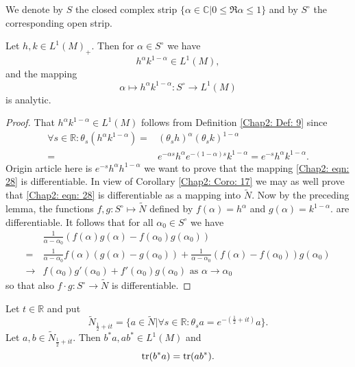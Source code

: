 We denote by $S$ the closed complex strip $\{\alpha\in \mathbb{C}|0\leq \Re \alpha\leq 1\}$ and by $S^\circ$ the corresponding open strip. \par
\begin{lemma}\label{Chap2: Lemma: 19}
    Let $h,k\in L^1(M)_+$. Then for $\alpha\in S^\circ$ we have 
\[
    h^\alpha k^{1-\alpha}\in L^1(M),
\]
and the mapping 
\begin{equation}\label{Chap2: eqn: 28}
    \alpha\mapsto h^\alpha k^{1-\alpha}: S^\circ \to L^1(M)
\end{equation} 
is analytic.
\end{lemma}
\begin{proof}
    That $ h^\alpha k^{1-\alpha}\in L^1(M)$ follows from Definition \ref{Chap2: Def: 9} since 
    \[
        \begin{split}
            \forall s\in \mathbb{R}: \theta_s(h^\alpha k^{1-\alpha})=&(\theta_s h)^\alpha (\theta_s k)^{1-\alpha}\\
            =& e^{-\alpha s}h^\alpha e^{-(1-\alpha)s}k^{1-\alpha}=e^{-s}h^\alpha k^{1-\alpha}.
        \end{split}
    \]
    {\color{red} Origin article here is $e^{-s}h^\alpha h^{1-\alpha}$} we want to prove that the mapping \eqref{Chap2: eqn: 28} is differentiable. In view of Corollary \ref{Chap2: Coro: 17} we may as well prove that \eqref{Chap2: eqn: 28} is differentiable as a mapping into $\tilde{N}$. Now by the preceding lemma, the functions $f,g:S^\circ \mapsto \tilde{N}$ defined by $f(\alpha)=h^\alpha$ and $g(\alpha)=k^{1-\alpha}.$ are differentiable. It follows that for all $\alpha_0\in S^\circ$ we have 
    \[
        \begin{split}
            &\frac{1}{\alpha-\alpha_0}(f(\alpha)g(\alpha)-f(\alpha_0)g(\alpha_0))\\
            =&\frac{1}{\alpha-\alpha_0}f(\alpha)(g(\alpha)-g(\alpha_0))+\frac{1}{\alpha-\alpha_0}(f(\alpha)-f(\alpha_0))g(\alpha_0)\\
            \to & f(\alpha_0)g'(\alpha_0)+f'(\alpha_0)g(\alpha_0) \text{ as } \alpha\to \alpha_0
        \end{split}
    \]
so that also $f\cdot g: S^\circ \to \tilde{N}$ is differentiable.
\end{proof}
\begin{lemma}\label{Chap2: Lemma: 20}
    Let $t\in \mathbb{R}$ and put 
    \begin{equation}\label{Chap2: eqn: 29}
        \tilde{N}_{\frac{1}{2}+it}=\{a\in \tilde{N}|\forall s\in \mathbb{R}: \theta_s a=e^{-(\frac{1}{2}+it)}a\}.
    \end{equation}
    Let $a,b\in \tilde{N}_{\frac{1}{2}+it}$. Then $b^*a, ab^*\in L^1(M)$ and 
    \begin{equation}\label{Chap2: eqn: 30}
        \tr(b^*a)=\tr(ab^*).
    \end{equation}
\end{lemma}
